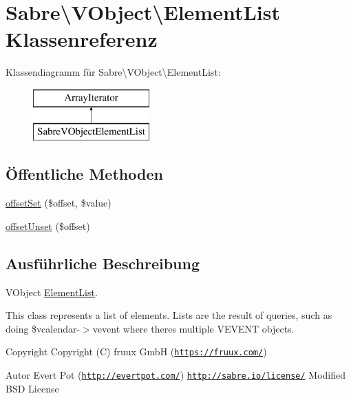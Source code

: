 \hypertarget{class_sabre_1_1_v_object_1_1_element_list}{}\section{Sabre\textbackslash{}V\+Object\textbackslash{}Element\+List Klassenreferenz}
\label{class_sabre_1_1_v_object_1_1_element_list}
Klassendiagramm für Sabre\textbackslash{}V\+Object\textbackslash{}Element\+List\+:\begin{figure}[H]
\begin{center}
\leavevmode
\includegraphics[height=2.000000cm]{class_sabre_1_1_v_object_1_1_element_list}
\end{center}
\end{figure}
\subsection*{Öffentliche Methoden}
\begin{DoxyCompactItemize}
\item 
\mbox{\hyperlink{class_sabre_1_1_v_object_1_1_element_list_a2e5227efc5c5611f51906b569dafd213}{offset\+Set}} (\$offset, \$value)
\item 
\mbox{\hyperlink{class_sabre_1_1_v_object_1_1_element_list_a395b69104498bc15129f4b4f64f26cdc}{offset\+Unset}} (\$offset)
\end{DoxyCompactItemize}


\subsection{Ausführliche Beschreibung}
V\+Object \mbox{\hyperlink{class_sabre_1_1_v_object_1_1_element_list}{Element\+List}}.

This class represents a list of elements. Lists are the result of queries, such as doing \$vcalendar-\/$>$vevent where there\textquotesingle{}s multiple V\+E\+V\+E\+NT objects.

\begin{DoxyCopyright}{Copyright}
Copyright (C) fruux GmbH (\href{https://fruux.com/}{\tt https\+://fruux.\+com/}) 
\end{DoxyCopyright}
\begin{DoxyAuthor}{Autor}
Evert Pot (\href{http://evertpot.com/}{\tt http\+://evertpot.\+com/})  \href{http://sabre.io/license/}{\tt http\+://sabre.\+io/license/} Modified B\+SD License 
\end{DoxyAuthor}


